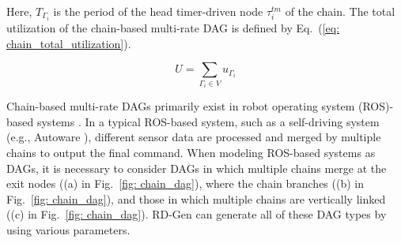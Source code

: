 \noindent Here, $T_{\Gamma_i}$ is the period of the head timer-driven node $\tau^{tm}_i$ of the chain.
The total utilization of the chain-based multi-rate DAG is defined by Eq.~(\ref{eq: chain_total_utilization}).

\begin{equation}
    \label{eq: chain_total_utilization}
    U = \sum_{\Gamma_i \in V}u_{\Gamma_i}
\end{equation}

Chain-based multi-rate DAGs primarily exist in robot operating system (ROS)-based systems \cite{casini2019response, choi2021picas}.
In a typical ROS-based system, such as a self-driving system (e.g., Autoware \cite{future}), different sensor data are processed and merged by multiple chains to output the final command.
When modeling ROS-based systems as DAGs, it is necessary to consider DAGs in which multiple chains merge at the exit nodes ((a) in Fig.~\ref{fig: chain_dag}), where the chain branches ((b) in Fig.~\ref{fig: chain_dag}), and those in which multiple chains are vertically linked ((c) in Fig.~\ref{fig: chain_dag}).
RD-Gen can generate all of these DAG types by using various parameters.
